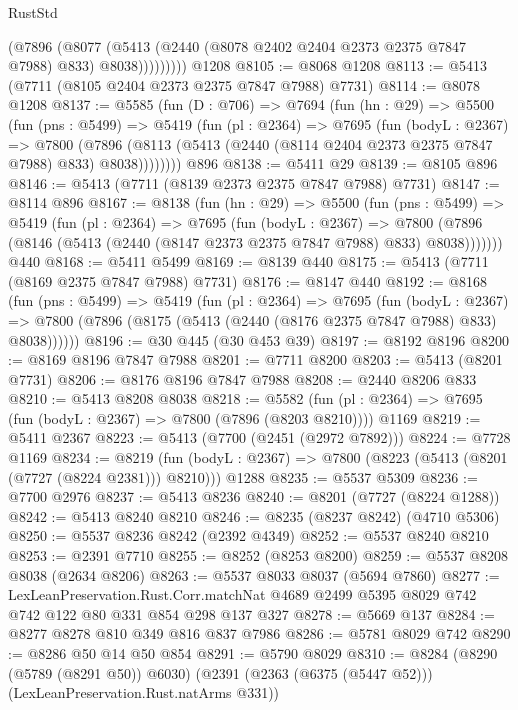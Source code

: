 \begin{lexlean}{RustStd}
\begin{coremodule}
                (@7896
                  (@8077
                    (@5413 (@2440 (@8078 @2402 @2404 @2373 @2375 @7847 @7988) @833) @8038)))))))))
    @1208
@8105 := @8068 @1208
@8113 := @5413 (@7711 (@8105 @2404 @2373 @2375 @7847 @7988) @7731)
@8114 := @8078 @1208
@8137 := @5585
    (fun (D : @706) =>
    @7694
      (fun (hn : @29) =>
      @5500
        (fun (pns : @5499) =>
        @5419
          (fun (pl : @2364) =>
          @7695
            (fun (bodyL : @2367) =>
            @7800
              (@7896 (@8113 (@5413 (@2440 (@8114 @2404 @2373 @2375 @7847 @7988) @833) @8038))))))))
    @896
@8138 := @5411 @29
@8139 := @8105 @896
@8146 := @5413 (@7711 (@8139 @2373 @2375 @7847 @7988) @7731)
@8147 := @8114 @896
@8167 := @8138
    (fun (hn : @29) =>
    @5500
      (fun (pns : @5499) =>
      @5419
        (fun (pl : @2364) =>
        @7695
          (fun (bodyL : @2367) =>
          @7800 (@7896 (@8146 (@5413 (@2440 (@8147 @2373 @2375 @7847 @7988) @833) @8038)))))))
    @440
@8168 := @5411 @5499
@8169 := @8139 @440
@8175 := @5413 (@7711 (@8169 @2375 @7847 @7988) @7731)
@8176 := @8147 @440
@8192 := @8168
    (fun (pns : @5499) =>
    @5419
      (fun (pl : @2364) =>
      @7695
        (fun (bodyL : @2367) =>
        @7800 (@7896 (@8175 (@5413 (@2440 (@8176 @2375 @7847 @7988) @833) @8038))))))
@8196 := @30 @445 (@30 @453 @39)
@8197 := @8192 @8196
@8200 := @8169 @8196 @7847 @7988
@8201 := @7711 @8200
@8203 := @5413 (@8201 @7731)
@8206 := @8176 @8196 @7847 @7988
@8208 := @2440 @8206 @833
@8210 := @5413 @8208 @8038
@8218 := @5582
    (fun (pl : @2364) => @7695 (fun (bodyL : @2367) => @7800 (@7896 (@8203 @8210))))
    @1169
@8219 := @5411 @2367
@8223 := @5413 (@7700 (@2451 (@2972 @7892)))
@8224 := @7728 @1169
@8234 := @8219
    (fun (bodyL : @2367) => @7800 (@8223 (@5413 (@8201 (@7727 (@8224 @2381))) @8210)))
    @1288
@8235 := @5537 @5309
@8236 := @7700 @2976
@8237 := @5413 @8236
@8240 := @8201 (@7727 (@8224 @1288))
@8242 := @5413 @8240 @8210
@8246 := @8235 (@8237 @8242) (@4710 @5306)
@8250 := @5537 @8236 @8242 (@2392 @4349)
@8252 := @5537 @8240 @8210
@8253 := @2391 @7710
@8255 := @8252 (@8253 @8200)
@8259 := @5537 @8208 @8038 (@2634 @8206)
@8263 := @5537 @8033 @8037 (@5694 @7860)
@8277 := LexLeanPreservation.Rust.Corr.matchNat
    @4689
    @2499
    @5395
    @8029
    @742
    @742
    @122
    @80
    @331
    @854
    @298
    @137
    @327
@8278 := @5669 @137
@8284 := @8277 @8278 @810 @349 @816 @837 @7986
@8286 := @5781 @8029 @742
@8290 := @8286 @50 @14 @50 @854
@8291 := @5790 @8029
@8310 := @8284
    (@8290 (@5789 (@8291 @50)) @6030)
    (@2391 (@2363 (@6375 (@5447 @52))) (LexLeanPreservation.Rust.natArms @331))

\end{coremodule}
\end{lexlean}

